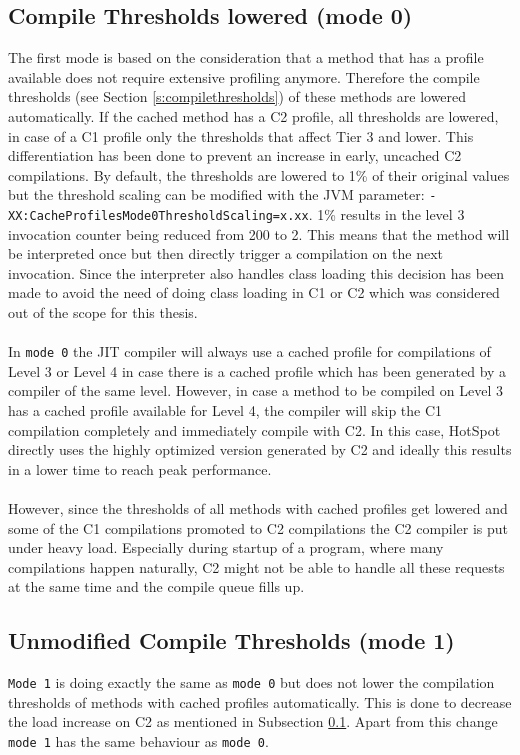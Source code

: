 \subsection{Compile Thresholds lowered (mode 0)}
\label{s:mode0}
The first mode is based on the consideration that a method that has a profile available does not require extensive profiling anymore. Therefore the compile thresholds (see Section \ref{s:compilethresholds}) of these methods are lowered automatically. If the cached method has a C2 profile, all thresholds are lowered, in case of a C1 profile only the thresholds that affect Tier 3 and lower. This differentiation has been done to prevent an increase in early, uncached C2 compilations. By default, the thresholds are lowered to 1\% of their original values but the threshold scaling can be modified with the JVM parameter: \texttt{-XX:CacheProfilesMode0ThresholdScaling=x.xx}. 1\% results in the level 3 invocation counter being reduced from 200 to 2. This means that the method will be interpreted once but then directly trigger a compilation on the next invocation.
Since the interpreter also handles class loading this decision has been made to avoid the need of doing class loading in C1 or C2 which was considered out of the scope for this thesis.
\\\\
In \texttt{mode 0} the JIT compiler will always use a cached profile for compilations of Level 3 or Level 4 in case there is a cached profile which has been generated by a compiler of the same level. However, in case a method to be compiled on Level 3 has a cached profile available for Level 4, the compiler will skip the C1 compilation completely and immediately compile with C2. In this case, HotSpot directly uses the highly optimized version generated by C2 and ideally this results in a lower time to reach peak performance.
\\\\
However, since the thresholds of all methods with cached profiles get lowered and some of the C1 compilations promoted to C2 compilations the C2 compiler is put under heavy load. Especially during startup of a program, where many compilations happen naturally, C2 might not be able to handle all these requests at the same time and the compile queue fills up.

\subsection{Unmodified Compile Thresholds (mode 1)}
\label{s:mode1}
\texttt{Mode 1} is doing exactly the same as \texttt{mode 0} but does not lower the compilation thresholds of methods with cached profiles automatically.
This is done to decrease the load increase on C2 as mentioned in Subsection \ref{s:mode0}.
Apart from this change \texttt{mode 1} has the same behaviour as \texttt{mode 0}.
